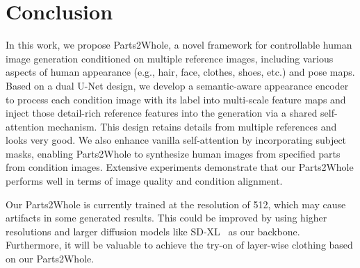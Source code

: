 \section{Conclusion}

In this work, we propose Parts2Whole, a novel framework for controllable human image generation conditioned on multiple reference images, including various aspects of human appearance (e.g., hair, face, clothes, shoes, etc.) and pose maps. Based on a dual U-Net design, we develop a semantic-aware appearance encoder to process each condition image with its label into multi-scale feature maps and inject those detail-rich reference features into the generation via a shared self-attention mechanism. This design retains details from multiple references and looks very good. We also enhance vanilla self-attention by incorporating subject masks, enabling Parts2Whole to synthesize human images from specified parts from condition images. Extensive experiments demonstrate that our Parts2Whole performs well in terms of image quality and condition alignment.

 Our Parts2Whole is currently trained at the resolution of 512, which may cause artifacts in some generated results. This could be improved by using higher resolutions and larger diffusion models like SD-XL~\cite{podell2023sdxl} as our backbone. Furthermore, it will be valuable to achieve the try-on of layer-wise clothing based on our Parts2Whole.
